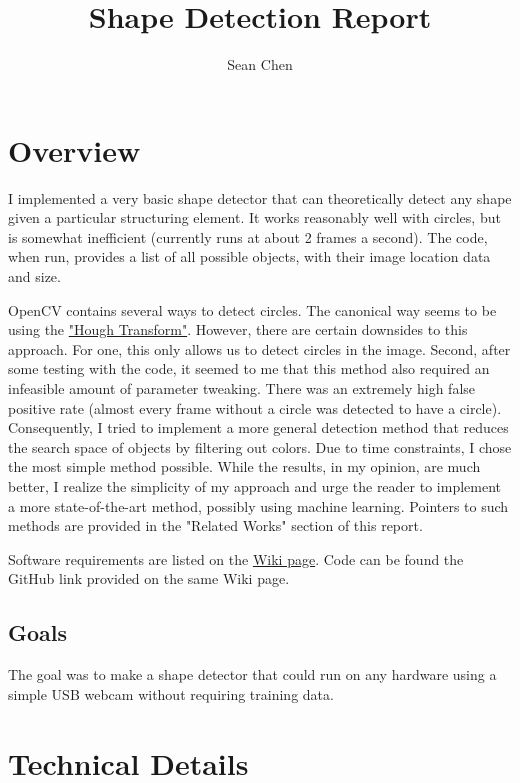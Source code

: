 \documentclass[11pt]{article}
\title{Shape Detection Report}
\author{Sean Chen}
\date{}
\begin{document}
\maketitle

\tableofcontents
\listoffigures

\section{Overview}
I implemented a very basic shape detector that can theoretically detect any shape given a particular structuring element.  It works reasonably well with circles, but is somewhat inefficient (currently runs at about 2 frames a second).  The code, when run, provides a list of all possible objects, with their image location data and size.

OpenCV contains several ways to detect circles.  The canonical way seems to be using the \href{http://docs.opencv.org/doc/tutorials/imgproc/imgtrans/hough_circle/hough_circle.html}{"Hough Transform"}. However, there are certain downsides to this approach.  For one, this only allows us to detect circles in the image.  Second, after some testing with the code, it seemed to me that this method also required an infeasible amount of parameter tweaking.  There was an extremely high false positive rate (almost every frame without a circle was detected to have a circle).  Consequently, I tried to implement a more general detection method that reduces the search space of objects by filtering out colors.  Due to time constraints, I chose the most simple method possible.  While the results, in my opinion, are much better, I realize the simplicity of my approach and urge the reader to implement a more state-of-the-art method, possibly using machine learning.  Pointers to such methods are provided in the "Related Works" section of this report.

Software requirements are listed on the \href{http://cornell-asl.org/wiki/index.php?title=Object_Detection#Further_work}{Wiki page}.  Code can be found the GitHub link provided on the same Wiki page.

\subsection{Goals}
The goal was to make a shape detector that could run on any hardware using a simple USB webcam without requiring training data.

\section{Technical Details}
\end{document}
